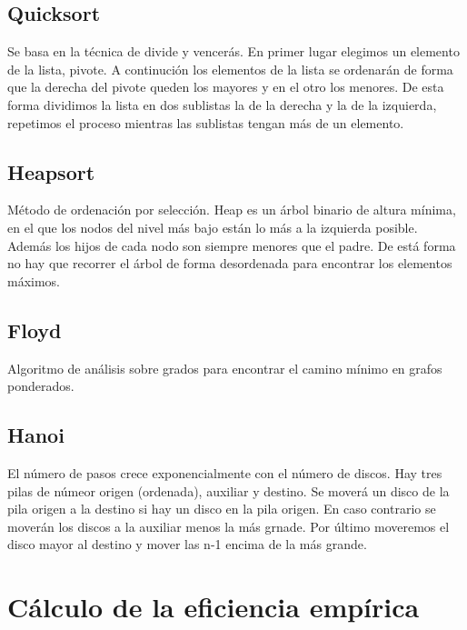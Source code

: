 \documentclass[11pt]{article}
\begin{document}
\subsection*{Quicksort}
Se basa en la técnica de divide y vencerás.
En primer lugar elegimos un elemento de la lista, pivote. A continución los elementos de la lista se ordenarán de forma que la derecha del pivote queden los mayores y en el otro los menores. De esta forma dividimos la lista en dos sublistas la de la derecha y la de la izquierda, repetimos el proceso mientras las sublistas tengan más de un elemento.

\subsection*{Heapsort}
Método de ordenación por selección.
Heap es un árbol binario de altura mínima, en el que los nodos del nivel más bajo están lo más a la izquierda posible. Además los hijos de cada nodo son siempre menores que el padre. De está forma no hay que recorrer el árbol de forma desordenada para encontrar los elementos máximos.

\subsection*{Floyd}
Algoritmo de análisis sobre grados para encontrar el camino mínimo en grafos ponderados.

\subsection*{Hanoi}
El número de pasos crece exponencialmente con el número de discos. Hay tres pilas de númeor origen (ordenada), auxiliar y destino. Se moverá un disco de la pila origen a la destino si hay un disco en la pila origen. En caso contrario se moverán los discos a la auxiliar menos la más grnade.
Por último moveremos el disco mayor al destino y mover las n-1 encima de la más grande.

\section*{Cálculo de la eficiencia empírica}


\begin{center}
	
\end{center}



\begin{center}
	
\end{center}
\end{document}
